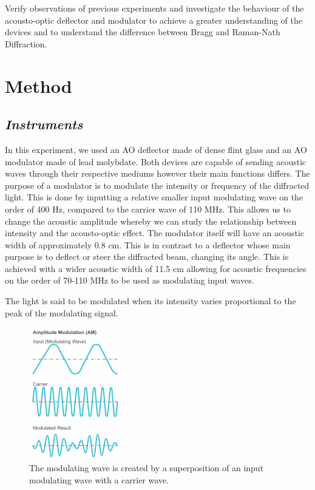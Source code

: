 \documentclass[aps,prl,reprint,10pt,amsmath,amssymb,superscriptaddress,a4paper]{revtex4-2}
\begin{document}
Verify observations of previous experiments and investigate the behaviour of the acousto-optic deflector and modulator to achieve a 
greater understanding of the devices and to understand the difference between Bragg and Raman-Nath Diffraction.

\section{Method}

\subsection{\normalfont\textit{Instruments}}
In this experiment, we used an AO deflector made of dense flint glass and an AO modulator made of lead molybdate. Both devices are capable 
of sending acoustic waves through their respective mediums however their main functions differs. The purpose of a modulator is to modulate 
the intensity or frequency of the diffracted light. This is done by inputting a relative smaller input modulating wave on the order of 
400 Hz, compared to the carrier wave of 110 MHz. This allows us to change the acoustic amplitude whereby we can study the relationship between 
intensity and the acousto-optic effect. The modulator itself will have an acoustic width of approximately 0.8 cm. This is in contrast to a 
deflector whose main purpose is to deflect or steer the diffracted beam, changing its angle. This is achieved with a wider acoustic width of 
11.5 cm allowing for acoustic frequencies on the order of 70-110 MHz to be used as modulating input waves.

The light is said to be modulated when its intensity varies proportional to the peak of the modulating signal. 

\begin{figure}[b]
    \includegraphics[width=4cm]{../Figures/modulation.png}
    \caption{The modulating wave is created by a superposition of an input modulating wave with a carrier wave.}
    \label{fig:mod}
\end{figure}
\end{document}
